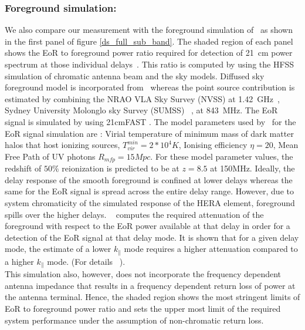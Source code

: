 \documentclass[twocolumn]{emulateapj}
\begin{document}
     \subsubsection{Foreground simulation:}  
    We also compare our measurement with the foreground simulation of~\citep{Thyagarajan_et_al2016} as shown in the first panel of figure \ref{ds_full_sub_band}. The shaded region of each panel shows the EoR to
    foreground power ratio required for detection of 21~cm power spectrum at those
    individual delays~\citep{Thyagarajan_et_al2016}. This ratio is computed by
    using the HFSS simulation of chromatic antenna beam and the sky models. Diffused sky foreground model is
    incorporated from~\citep{deolivieracosta_et_al2008} whereas the point source
    contribution is estimated by combining the NRAO VLA Sky Survey (NVSS) at
    1.42~GHz~\citep{Condon_1998}, Sydney University Molonglo sky Survey (SUMSS)
    ~\citep{Bock_et_al_1999}, \citep{Mauch_et_al_2003} at 843~MHz. The EoR signal
    is simulated by using 21cmFAST \citep{Messinger_et_al2011}. The model
    parameters used by~\cite{Thyagarajan_et_al2016} for the EoR signal simulation
    are : Virial temperature of minimum mass of dark matter halos that host
    ionizing sources, $T_{vir}^{min} = 2*10^4 K$, Ionising efficiency $\eta = 20$,
    Mean Free Path of UV photons $R_{mfp} = 15Mpc.$ For these model parameter
    values, the redshift of $50\%$ reionization is predicted to be at $z = 8.5$ at
    150MHz.  Ideally, the delay response of the smooth foreground is confined at
    lower delays whereas the same for the EoR signal is spread across the entire
    delay range. However, due to system chromaticity of the simulated response of
    the HERA element, foreground spills over the higher delays.
    ~\cite{Thyagarajan_et_al2016} computes the required attenuation of the
    foreground with respect to the EoR power available at that delay in order for a
    detection of the EoR signal at that delay mode. It is shown that for a given
    delay mode, the estimate of a lower $k_{\parallel}$ mode requires a higher
    attenuation compared to a higher $k_{\parallel}$ mode. (For details
    ~\cite{Thyagarajan_et_al2016}). \\
     This simulation also, however, does not incorporate the frequency dependent antenna impedance that 
     results in a frequency dependent return loss of power at the antenna terminal. Hence, the shaded region shows the most      
     stringent limits of  EoR to foreground power ratio and sets the upper most limit of the required system performance under the assumption of non-chromatic return loss. 
     
\end{document}
